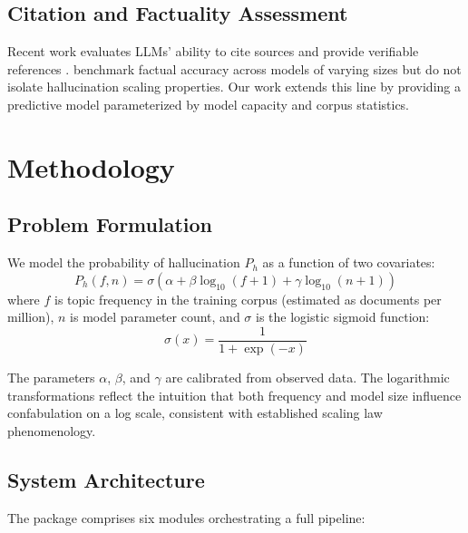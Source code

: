 \documentclass[11pt,a4paper]{article}
\begin{document}
\subsection{Citation and Factuality Assessment}

Recent work evaluates LLMs' ability to cite sources and provide verifiable references \citep{Thawani2022Attribution, Kashyap2022LLMCitation}. \citet{Burns2022FactualityEvaluation} benchmark factual accuracy across models of varying sizes but do not isolate hallucination scaling properties. Our work extends this line by providing a predictive model parameterized by model capacity and corpus statistics.

\section{Methodology}

\subsection{Problem Formulation}

We model the probability of hallucination $P_h$ as a function of two covariates:
\begin{equation}
P_h(f, n) = \sigma(\alpha + \beta \log_{10}(f + 1) + \gamma \log_{10}(n + 1))
\end{equation}
where $f$ is topic frequency in the training corpus (estimated as documents per million), $n$ is model parameter count, and $\sigma$ is the logistic sigmoid function:
\begin{equation}
\sigma(x) = \frac{1}{1 + \exp(-x)}
\end{equation}

The parameters $\alpha$, $\beta$, and $\gamma$ are calibrated from observed data. The logarithmic transformations reflect the intuition that both frequency and model size influence confabulation on a log scale, consistent with established scaling law phenomenology.

\subsection{System Architecture}

The package comprises six modules orchestrating a full pipeline:
\end{document}
